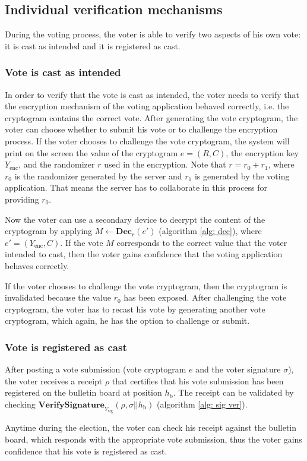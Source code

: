 \subsection{Individual verification mechanisms} \label{sec: individual verification mechanisms}
During the voting process, the voter is able to verify two aspects of his own vote: it is cast as intended and it is registered as cast.


\subsubsection{Vote is cast as intended}
In order to verify that the vote is cast as intended, the voter needs to verify that the encryption mechanism of the voting application behaved correctly, i.e. the cryptogram contains the correct vote. After generating the vote cryptogram, the voter can choose whether to submit his vote or to challenge the encryption process. If the voter chooses to challenge the vote cryptogram, the system will print on the screen the value of the cryptogram $e = (R, C)$, the encryption key $Y_\mathrm{enc}$, and the randomizer $r$ used in the encryption. Note that \( r = r_0 + r_1 \), where $r_0$ is the randomizer generated by the server and $r_1$ is generated by the voting application. That means the server has to collaborate in this process for providing $r_0$.

Now the voter can use a secondary device to decrypt the content of the cryptogram by applying \( M \gets \mathbf{Dec}_{r} (e') \) (algorithm \ref{alg: dec}), where $e' = (Y_\mathrm{enc}, C)$. If the vote $M$ corresponds to the correct value that the voter intended to cast, then the voter gains confidence that the voting application behaves correctly.

If the voter chooses to challenge the vote cryptogram, then the cryptogram is invalidated because the value $r_0$ has been exposed. After challenging the vote cryptogram, the voter has to recast his vote by generating another vote cryptogram, which again, he has the option to challenge or submit.

 
\subsubsection{Vote is registered as cast} \label{sec: vote is registered as cast}
After posting a vote submission (vote cryptogram $e$ and the voter signature $\sigma$), the voter receives a receipt $\rho$ that certifies that his vote submission has been registered on the bulletin board at position $h_\mathrm{b}$. The receipt can be validated by checking \( \mathbf{VerifySignature}_{Y_\mathrm{sig}} (\rho, \sigma || h_\mathrm{b}) \) (algorithm \ref{alg: sig ver}).

Anytime during the election, the voter can check his receipt against the bulletin board, which responds with the appropriate vote submission, thus the voter gains confidence that his vote is registered as cast.
